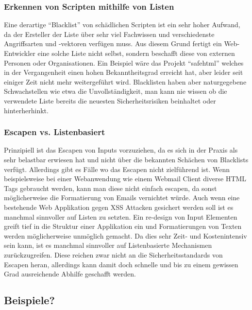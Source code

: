 \subsubsection{Erkennen von Scripten mithilfe von Listen}
Eine derartige ``Blacklist'' von sch\"adlichen Scripten ist ein sehr hoher Aufwand, da der Ersteller der Liste \"uber sehr viel Fachwissen und verschiedenste Angriffsarten und -vektoren verf\"ugen muss. Aus diesem Grund fertigt ein Web-Entwickler eine solche Liste nicht selbst, sondern beschafft diese von externen Personen oder Organisationen. Ein Beispiel w\"are das Projekt ``safehtml'' welches in der Vergangenheit einen hohen Bekanntheitsgrad erreicht hat, aber leider seit einiger Zeit nicht mehr weitergef\"uhrt wird. Blacklisten haben aber naturgegebene Schwachstellen wie etwa die Unvollst\"andigkeit, man kann nie wissen ob die verwendete Liste bereits die neuesten Sicherheitsrisiken beinhaltet oder hinterherhinkt.
\cite{xssBuch}

\subsubsection{Escapen vs. Listenbasiert}
Prinzipiell ist das Escapen von Inputs vorzuziehen, da es sich in der Praxis als sehr belastbar erwiesen hat und nicht \"uber die bekannten Sch\"achen von Blacklists verf\"ugt. Allerdings gibt es F\"alle wo das Escapen nicht zielf\"uhrend ist. Wenn beispielsweise bei einer Webanwendung wie einem Webmail Client diverse HTML Tags gebraucht werden, kann man diese nicht einfach escapen, da sonst m\"oglicherweise die Formatierung von Emails vernichtet w\"urde. Auch wenn eine bestehende Web Applikation gegen XSS Attacken gesichert werden soll ist es manchmal sinnvoller auf Listen zu setzten. Ein re-design von Input Elementen greift tief in die Struktur einer Applikation ein und Formatierungen von Texten werden m\"oglicherweise unm\"oglich gemacht. Da dies sehr Zeit- und Kostenintensiv sein kann, ist es manchmal sinnvoller auf Listenbasierte Mechanismen zur\"uckzugreifen. Diese reichen zwar nicht an die Sicherheitsstandards von Escapen heran, allerdings kann damit doch schnelle und bis zu einem gewissen Grad ausreichende Abhilfe geschafft werden.
\cite{xssBuch}

\subsection{Beispiele?}
